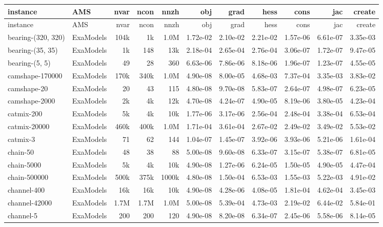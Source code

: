 {\scriptsize
\setlength{\tabcolsep}{4pt}
\begin{longtable}{@{}ll rrr rrr rr r@{}}
  \toprule
  instance & AMS & nvar & ncon & nnzh & obj & grad & hess & cons & jac & create \\
  \midrule
  \endfirsthead
  \toprule
  instance & AMS & nvar & ncon & nnzh & obj & grad & hess & cons & jac & create \\
  \midrule
  \endhead
  bearing-(320, 320) & ExaModels & 104k & 1k & 1.0M & 1.72e-02 & 2.10e-02 & 2.21e-02 & 1.57e-06 & 6.61e-07 & 3.35e-03 \\
  bearing-(35, 35) & ExaModels & 1k & 148 & 13k & 2.18e-04 & 2.65e-04 & 2.76e-04 & 3.06e-07 & 1.72e-07 & 9.47e-05 \\
  bearing-(5, 5) & ExaModels & 49 & 28 & 360 & 6.63e-06 & 7.86e-06 & 8.18e-06 & 1.96e-07 & 1.23e-07 & 4.55e-05 \\
  camshape-170000 & ExaModels & 170k & 340k & 1.0M & 4.90e-08 & 8.00e-05 & 4.68e-03 & 7.37e-04 & 3.35e-03 & 3.83e-02 \\
  camshape-20 & ExaModels & 20 & 43 & 115 & 4.80e-08 & 9.70e-08 & 5.83e-07 & 2.64e-07 & 4.98e-07 & 6.23e-05 \\
  camshape-2000 & ExaModels & 2k & 4k & 12k & 4.70e-08 & 4.24e-07 & 4.90e-05 & 8.19e-06 & 3.80e-05 & 4.23e-04 \\
  catmix-200 & ExaModels & 5k & 4k & 10k & 1.77e-06 & 3.17e-06 & 2.56e-04 & 2.48e-04 & 3.38e-04 & 6.53e-04 \\
  catmix-20000 & ExaModels & 460k & 400k & 1.0M & 1.71e-04 & 3.61e-04 & 2.67e-02 & 2.49e-02 & 3.49e-02 & 5.53e-02 \\
  catmix-3 & ExaModels & 71 & 62 & 144 & 1.04e-07 & 1.45e-07 & 3.92e-06 & 3.93e-06 & 5.21e-06 & 1.61e-04 \\
  chain-50 & ExaModels & 48 & 38 & 88 & 5.00e-08 & 9.60e-08 & 6.33e-07 & 3.15e-07 & 5.38e-07 & 6.81e-05 \\
  chain-5000 & ExaModels & 5k & 4k & 10k & 4.90e-08 & 1.27e-06 & 6.24e-05 & 1.50e-05 & 4.90e-05 & 4.47e-04 \\
  chain-500000 & ExaModels & 500k & 375k & 1000k & 4.80e-08 & 1.50e-04 & 6.53e-03 & 1.55e-03 & 5.22e-03 & 4.91e-02 \\
  channel-400 & ExaModels & 16k & 16k & 10k & 4.90e-08 & 4.28e-06 & 4.08e-05 & 1.81e-04 & 4.62e-04 & 3.45e-03 \\
  channel-42000 & ExaModels & 1.7M & 1.7M & 1.0M & 5.00e-08 & 5.39e-04 & 4.73e-03 & 2.19e-02 & 6.44e-02 & 5.84e-01 \\
  channel-5 & ExaModels & 200 & 200 & 120 & 4.90e-08 & 8.20e-08 & 6.34e-07 & 2.45e-06 & 5.58e-06 & 8.14e-05 \\

\end{longtable}}
